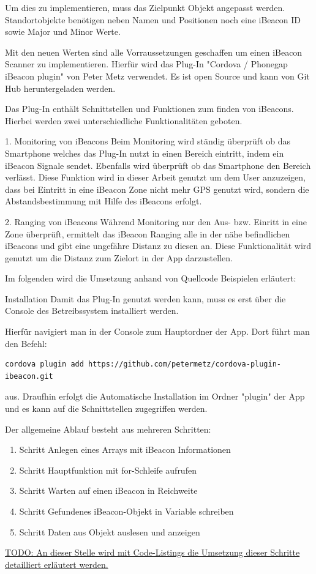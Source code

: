 Um dies zu implementieren, muss das Zielpunkt Objekt angepasst werden. Standortobjekte benötigen neben Namen und Positionen noch eine iBeacon ID sowie Major und Minor Werte.

Mit den neuen Werten sind alle Vorraussetzungen geschaffen um einen iBeacon Scanner zu implementieren. Hierfür wird das Plug-In "Cordova / Phonegap iBeacon plugin" von Peter Metz verwendet. Es ist open Source und kann von Git Hub heruntergeladen werden.

Das Plug-In enthält Schnittstellen und Funktionen zum finden von iBeacons. Hierbei werden zwei unterschiedliche Funktionalitäten geboten.


1. Monitoring von iBeacons
Beim Monitoring wird ständig überprüft ob das Smartphone welches das Plug-In nutzt in einen Bereich eintritt, indem ein iBeacon Signale sendet. Ebenfalls wird überprüft ob das Smartphone den Bereich verlässt. Diese Funktion wird in dieser Arbeit genutzt um dem User anzuzeigen, dass bei Eintritt in eine iBeacon Zone nicht mehr GPS genutzt wird, sondern die Abstandsbestimmung mit Hilfe des iBeacons erfolgt.

2. Ranging von iBeacons
Während Monitoring nur den Aus- bzw. Einritt in eine Zone überprüft, ermittelt das iBeacon Ranging alle in der nähe befindlichen iBeacons und gibt eine ungefähre Distanz zu diesen an. Diese Funktionalität wird genutzt um die Distanz zum Zielort in der App darzustellen.\cite{MonitorRange}


Im folgenden wird die Umsetzung anhand von Quellcode Beispielen erläutert:

Installation
Damit das Plug-In genutzt werden kann, muss es erst über die Console des Betreibssystem installiert werden.

Hierfür navigiert man in der Console zum Hauptordner der App. Dort führt man den Befehl:

\begin{lstlisting}
cordova plugin add https://github.com/petermetz/cordova-plugin-ibeacon.git
\end{lstlisting} 


aus. Draufhin erfolgt die Automatische Installation im Ordner "plugin" der App und es kann auf die Schnittstellen zugegriffen werden.

Der allgemeine Ablauf besteht aus mehreren Schritten:
\begin{enumerate}
\item Schritt Anlegen eines Arrays mit iBeacon Informationen
\item Schritt Hauptfunktion mit for-Schleife aufrufen
\item Schritt Warten auf einen iBeacon in Reichweite
\item Schritt Gefundenes iBeacon-Objekt in Variable schreiben
\item Schritt Daten aus Objekt auslesen und anzeigen
\end{enumerate}



\underline{TODO: An dieser Stelle wird mit Code-Listings die Umsetzung dieser Schritte }\\
\underline{detailliert erläutert werden.}
